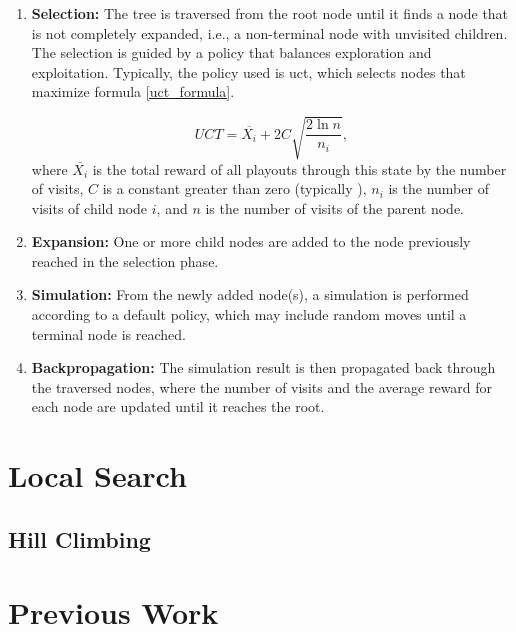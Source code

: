 \begin{enumerate}
	\item \textbf{Selection:} The tree is traversed from the root node until it finds a node that is not completely expanded, i.e., a non-terminal node with unvisited children. The selection is guided by a policy that balances exploration and exploitation. Typically, the policy used is \ac{uct}, which selects nodes that maximize formula \ref{uct_formula}.
	 
	\begin{equation}
	UCT = \overline{X_i} + 2C\sqrt{\frac{2\ln{n}}{n_i}},\label{uct_formula}
	\end{equation} where \(\overline{X_i}\) is the total reward of all playouts through this state by the number of visits, \(C\) is a constant greater than zero (typically ), \(n_i\) is the number of visits of child node \(i\), and \(n\) is the number of visits of the parent node.
    \item \textbf{Expansion:} One or more child nodes are added to the node previously reached in the selection phase.
    \item \textbf{Simulation:} From the newly added node(s), a simulation is performed according to a default policy, which may include random moves until a terminal node is reached.
    \item \textbf{Backpropagation:} The simulation result is then propagated back through the traversed nodes, where the number of visits and the average reward for each node are updated until it reaches the root.
\end{enumerate}

\section{Local Search}

\subsection{Hill Climbing}



\section{Previous Work}


